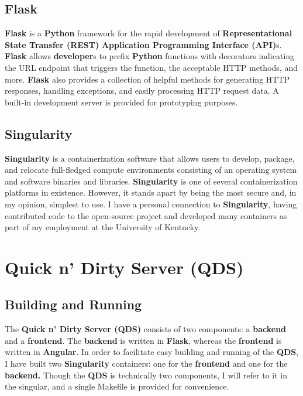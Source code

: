 \documentclass[12pt]{report}
\begin{document}
    \section{Flask}

\textbf{Flask} \cite{flask} is a \textbf{Python} framework for the rapid
development of \textbf{Representational State Transfer (REST)}
\textbf{Application Programming Interface (API)}s. \textbf{Flask} allows
\textbf{developer}s to prefix \textbf{Python} functions with decorators
indicating the URL endpoint that triggers the function, the acceptable HTTP
methods, and more. \textbf{Flask} also provides a collection of helpful methods
for generating HTTP responses, handling exceptions, and easily processing HTTP
request data. A built-in development server is provided for prototyping
purposes.
    
    \section{Singularity}

\textbf{Singularity} \cite{singularity} is a containerization software that
allows users to develop, package, and relocate full-fledged compute environments
consisting of an operating system and software binaries and libraries.
\textbf{Singularity} is one of several containerization platforms in existence.
However, it stands apart by being the most secure and, in my opinion, simplest
to use. I have a personal connection to \textbf{Singularity}, having contributed
code to the open-source project and developed many containers as part of my
employment at the University of Kentucky.

\chapter{Quick n' Dirty Server (QDS)}

    \section{Building and Running}

The \textbf{Quick n' Dirty Server (QDS)} consists of two components: a
\textbf{backend} and a \textbf{frontend}. The \textbf{backend} is written in
\textbf{Flask}, whereas the \textbf{frontend} is written in \textbf{Angular}. In
order to facilitate easy building and running of the \textbf{QDS}, I have built
two \textbf{Singularity} containers: one for the \textbf{frontend} and one for
the \textbf{backend.} Though the \textbf{QDS} is technically two components, I
will refer to it in the singular, and a single Makefile is provided for
convenience.
\end{document}
